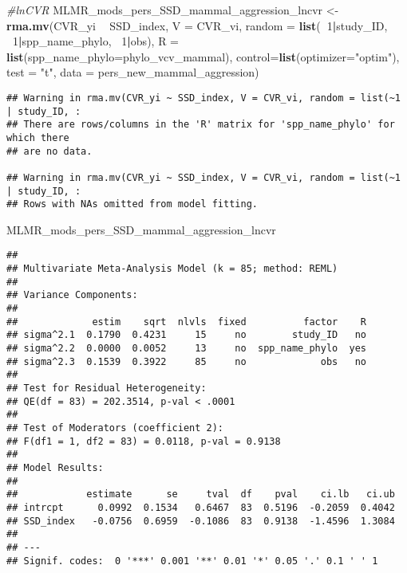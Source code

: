 \documentclass[]{article}
\newenvironment{Shaded}{\begin{snugshade}}{\end{snugshade}}
\newcommand{\KeywordTok}[1]{\textcolor[rgb]{0.13,0.29,0.53}{\textbf{#1}}}
\newcommand{\DataTypeTok}[1]{\textcolor[rgb]{0.13,0.29,0.53}{#1}}
\newcommand{\DecValTok}[1]{\textcolor[rgb]{0.00,0.00,0.81}{#1}}
\newcommand{\StringTok}[1]{\textcolor[rgb]{0.31,0.60,0.02}{#1}}
\newcommand{\CommentTok}[1]{\textcolor[rgb]{0.56,0.35,0.01}{\textit{#1}}}
\newcommand{\OperatorTok}[1]{\textcolor[rgb]{0.81,0.36,0.00}{\textbf{#1}}}
\newcommand{\NormalTok}[1]{#1}
\begin{document}
\begin{Shaded}
\begin{Highlighting}[]
    \CommentTok{#lnCVR}
\NormalTok{    MLMR_mods_pers_SSD_mammal_aggression_lncvr <-}\StringTok{ }\KeywordTok{rma.mv}\NormalTok{(CVR_yi }\OperatorTok{~}\StringTok{ }\NormalTok{SSD_index, }\DataTypeTok{V =}\NormalTok{ CVR_vi, }
                                            \DataTypeTok{random =} \KeywordTok{list}\NormalTok{(}\OperatorTok{~}\DecValTok{1}\OperatorTok{|}\NormalTok{study_ID, }\OperatorTok{~}\DecValTok{1}\OperatorTok{|}\NormalTok{spp_name_phylo, }\OperatorTok{~}\DecValTok{1}\OperatorTok{|}\NormalTok{obs), }
                                            \DataTypeTok{R =} \KeywordTok{list}\NormalTok{(}\DataTypeTok{spp_name_phylo=}\NormalTok{phylo_vcv_mammal), }\DataTypeTok{control=}\KeywordTok{list}\NormalTok{(}\DataTypeTok{optimizer=}\StringTok{"optim"}\NormalTok{), }
                                            \DataTypeTok{test =} \StringTok{"t"}\NormalTok{, }\DataTypeTok{data =}\NormalTok{ pers_new_mammal_aggression)}
\end{Highlighting}
\end{Shaded}

\begin{verbatim}
## Warning in rma.mv(CVR_yi ~ SSD_index, V = CVR_vi, random = list(~1 | study_ID, :
## There are rows/columns in the 'R' matrix for 'spp_name_phylo' for which there
## are no data.

## Warning in rma.mv(CVR_yi ~ SSD_index, V = CVR_vi, random = list(~1 | study_ID, :
## Rows with NAs omitted from model fitting.
\end{verbatim}

\begin{Shaded}
\begin{Highlighting}[]
\NormalTok{    MLMR_mods_pers_SSD_mammal_aggression_lncvr}
\end{Highlighting}
\end{Shaded}

\begin{verbatim}
## 
## Multivariate Meta-Analysis Model (k = 85; method: REML)
## 
## Variance Components:
## 
##             estim    sqrt  nlvls  fixed          factor    R 
## sigma^2.1  0.1790  0.4231     15     no        study_ID   no 
## sigma^2.2  0.0000  0.0052     13     no  spp_name_phylo  yes 
## sigma^2.3  0.1539  0.3922     85     no             obs   no 
## 
## Test for Residual Heterogeneity:
## QE(df = 83) = 202.3514, p-val < .0001
## 
## Test of Moderators (coefficient 2):
## F(df1 = 1, df2 = 83) = 0.0118, p-val = 0.9138
## 
## Model Results:
## 
##            estimate      se     tval  df    pval    ci.lb   ci.ub 
## intrcpt      0.0992  0.1534   0.6467  83  0.5196  -0.2059  0.4042    
## SSD_index   -0.0756  0.6959  -0.1086  83  0.9138  -1.4596  1.3084    
## 
## ---
## Signif. codes:  0 '***' 0.001 '**' 0.01 '*' 0.05 '.' 0.1 ' ' 1
\end{verbatim}
\end{document}
